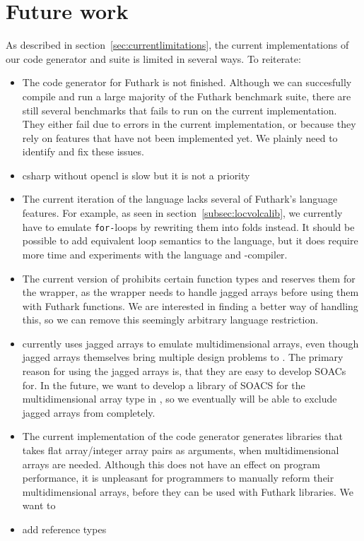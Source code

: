\section*{Future work}
As described in section~\ref{sec:currentlimitations}, the current
implementations of our code generator and \fshark{} suite is limited in several
ways. To reiterate:
\begin{itemize}
\item The \csharp{} code generator for Futhark is not finished. Although we can
  succesfully compile and run a large majority of the Futhark benchmark suite,
  there are still several benchmarks that fails to run on the current implementation.
  They either fail due to errors in the current implementation, or because they rely on features that
  have not been implemented yet.
  We plainly need to identify and fix these issues.

\item csharp without opencl is slow but it is not a priority
  
\item The current iteration of the \fshark{} language lacks several of Futhark's
  language features.
  For example, as seen in section~\ref{subsec:locvolcalib}, we currently have to emulate \texttt{for-}loops by rewriting them into folds instead.
  It should be possible to add equivalent loop semantics to the \fshark{} language,
  but it does require more time and experiments with the \fsharp{} language and -compiler.

\item The current version of \fshark{} prohibits certain function types and
  reserves them for the \fshark{} wrapper, as the wrapper needs to handle jagged
  arrays before using them with \csharp{} Futhark functions.
  We are interested in finding a better way of handling this, so we can remove
  this seemingly arbitrary language restriction.
  
\item \fshark{} currently uses jagged arrays to emulate multidimensional
  arrays, even though jagged arrays themselves bring multiple design problems to
  \fshark{}. The primary reason for using the jagged arrays is, that they are easy to develop SOACs for.
  In the future, we want to develop a library of SOACS for the
  multidimensional array type in \fsharp{}, so we eventually will be able to
  exclude jagged arrays from \fshark{} completely.

\item The current implementation of the \csharp{} code generator generates
  \csharp{} libraries that takes flat array/integer array pairs as arguments,
  when multidimensional arrays are needed.
  Although this does not have an effect on program performance, it is unpleasant
  for programmers to manually reform their multidimensional arrays, before they
  can be used with Futhark libraries.
  We want to 

\item add reference types
  

\end{itemize}



